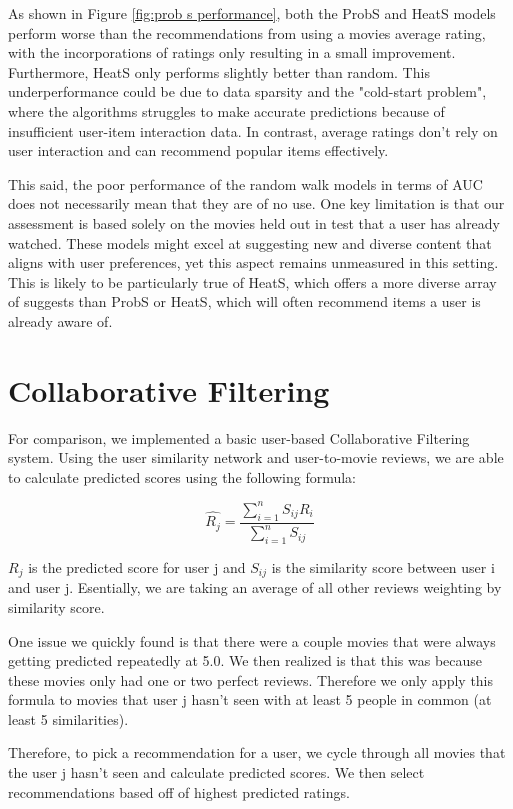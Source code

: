 \documentclass[12pt]{article}
\numberwithin{equation}{section}
\begin{document}
As shown in Figure \ref{fig:prob s performance}, both the ProbS and HeatS models perform worse than the recommendations from using a movies average rating, with the incorporations of ratings only resulting in a small improvement. Furthermore, HeatS only performs slightly better than random. This underperformance could be due to data sparsity and the "cold-start problem", where the algorithms struggles to make accurate predictions because of insufficient user-item interaction data. In contrast, average ratings don't rely on user interaction and can recommend popular items effectively.

This said, the poor performance of the random walk models in terms of AUC does not necessarily mean that they are of no use. One key limitation is that our assessment is based solely on the movies held out in test that a user has already watched. These models might excel at suggesting new and diverse content that aligns with user preferences, yet this aspect remains unmeasured in this setting. This is likely to be particularly true of HeatS, which offers a more diverse array of suggests than ProbS or HeatS, which will often recommend items a user is already aware of.

\section{Collaborative Filtering}
For comparison, we implemented a basic user-based Collaborative Filtering system. Using the user similarity network and user-to-movie reviews, we are able to calculate predicted scores using the following formula:

\[
\hat{R_j} = \frac{\sum_{i=1}^n S_{ij}R_i}{\sum_{i=1}^n S_{ij}}
\]

$R_j$ is the predicted score for user j and $S_{ij}$ is the similarity score between user i and user j. Esentially, we are taking an average of all other reviews weighting by similarity score.

One issue we quickly found is that there were a couple movies that were always getting predicted repeatedly at 5.0.  We then realized is that this was because these movies only had one or two perfect reviews. Therefore we only apply this formula to movies that user j hasn't seen with at least 5 people in common (at least 5 similarities).

Therefore, to pick a recommendation for a user, we cycle through all movies that the user j hasn't seen and calculate predicted scores. We then select recommendations based off of highest predicted ratings.
\end{document}
